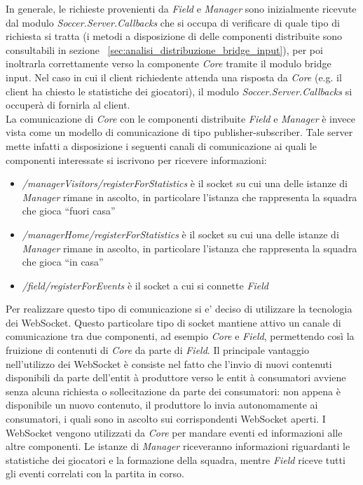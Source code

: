In generale, le richieste provenienti da \emph{Field} e \emph{Manager} sono inizialmente ricevute dal modulo \emph{Soccer.Server.Callbacks} che si occupa di verificare di quale tipo di richiesta si tratta (i metodi a disposizione di delle componenti distribuite sono consultabili in sezione ~\ref{sec:analisi_distribuzione_bridge_input}), per poi inoltrarla correttamente verso la componente \emph{Core} tramite il modulo bridge input. Nel caso in cui il client richiedente attenda una risposta da \emph{Core} (e.g. il client ha chiesto le statistiche dei giocatori), il modulo \emph{Soccer.Server.Callbacks} si occuper\`{a} di fornirla al client.\\

La comunicazione di \emph{Core} con le componenti distribuite \emph{Field} e \emph{Manager} \`{e} invece vista come un modello di comunicazione di tipo publisher-subscriber. Tale server mette infatti a disposizione i seguenti canali di comunicazione ai quali le componenti interessate si iscrivono per ricevere informazioni:

\begin{itemize}
	\item \emph{/managerVisitors/registerForStatistics} \`{e} il socket su cui una delle istanze di \emph{Manager} rimane in ascolto, in particolare l'istanza che rappresenta la squadra che gioca ``fuori casa''
	\item \emph{/managerHome/registerForStatistics} \`{e} il socket su cui una delle istanze di \emph{Manager} rimane in ascolto, in particolare l'istanza che rappresenta la squadra che gioca ``in casa''
	\item \emph{/field/registerForEvents} \`{e} il socket a cui si connette \emph{Field}
\end{itemize}

\noindent Per realizzare questo tipo di comunicazione si e' deciso di utilizzare la tecnologia dei WebSocket. Questo particolare tipo di socket mantiene attivo un canale di comunicazione tra due componenti, ad esempio \emph{Core} e \emph{Field}, permettendo cos\`{i} la fruizione di contenuti di \emph{Core} da parte di \emph{Field}. Il principale vantaggio nell'utilizzo dei WebSocket \`{e} consiste nel fatto che l'invio di nuovi contenuti disponibili da parte dell'entit \`{a} produttore verso le entit \`{a} consumatori avviene senza alcuna richiesta o sollecitazione da parte dei consumatori: non appena \`{e} disponibile un nuovo contenuto, il produttore lo invia autonomamente ai consumatori, i quali sono in ascolto sui corrispondenti WebSocket aperti. I WebSocket vengono utilizzati da \emph{Core} per mandare eventi ed informazioni alle altre componenti. Le istanze di \emph{Manager} riceveranno informazioni riguardanti le statistiche dei giocatori e la formazione della squadra, mentre \emph{Field} riceve tutti gli eventi correlati con la partita in corso.\\

